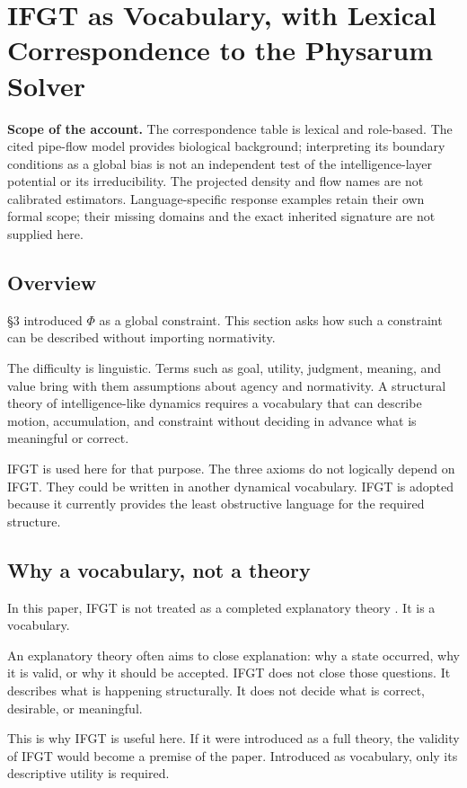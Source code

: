 \section{IFGT as Vocabulary, with Lexical Correspondence to the Physarum Solver}

\noindent\textbf{Scope of the account.} The correspondence table is lexical and role-based. The cited pipe-flow model provides biological background; interpreting its boundary conditions as a global bias is not an independent test of the intelligence-layer potential or its irreducibility. The projected density and flow names are not calibrated estimators. Language-specific response examples retain their own formal scope; their missing domains and the exact inherited signature are not supplied here.


\subsection{Overview}

\S{}3 introduced $\Phi$ as a global constraint. This section asks how such a constraint can be described without importing normativity.

The difficulty is linguistic. Terms such as goal, utility, judgment, meaning, and value bring with them assumptions about agency and normativity. A structural theory of intelligence-like dynamics requires a vocabulary that can describe motion, accumulation, and constraint without deciding in advance what is meaningful or correct.

IFGT is used here for that purpose. The three axioms do not logically depend on IFGT. They could be written in another dynamical vocabulary. IFGT is adopted because it currently provides the least obstructive language for the required structure.

\subsection{Why a vocabulary, not a theory}

In this paper, IFGT is not treated as a completed explanatory theory \citep{IFGT}. It is a vocabulary.

An explanatory theory often aims to close explanation: why a state occurred, why it is valid, or why it should be accepted. IFGT does not close those questions. It describes what is happening structurally. It does not decide what is correct, desirable, or meaningful.

This is why IFGT is useful here. If it were introduced as a full theory, the validity of IFGT would become a premise of the paper. Introduced as vocabulary, only its descriptive utility is required.


